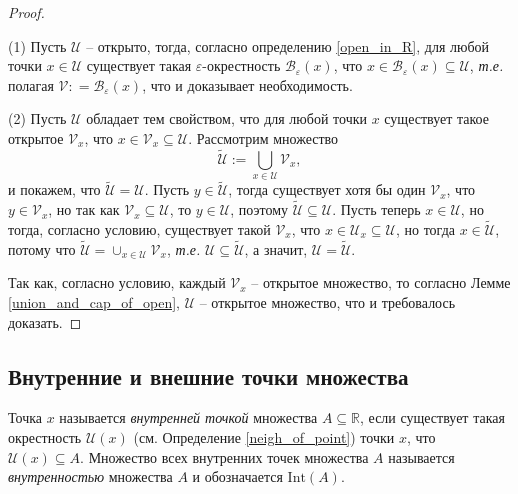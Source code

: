 \begin{proof}~

(1) Пусть $\mathscr{U}$ -- открыто, тогда, согласно определению \ref{open_in_R}, для любой точки $x\in \mathscr{U}$ существует такая $\varepsilon$-окрестность $\mathscr{B}_\varepsilon(x)$, что $x \in \mathscr{B}_\varepsilon(x) \subseteq \mathscr{U}$, \textit{т.е.} полагая $\mathscr{V}: = \mathscr{B}_\varepsilon(x)$, что и доказывает необходимость.

(2) Пусть $\mathscr{U}$ обладает тем свойством, что для любой точки $x$ существует такое открытое $\mathscr{V}_x$, что $x\in \mathscr{V}_x \subseteq \mathscr{U}.$ Рассмотрим множество
\begin{equation}
  \widetilde{\mathscr{U}}:=\bigcup_{x\in \mathscr{U}}\mathscr{V}_x, \label{open=union_of_opens}    
\end{equation}
и покажем, что $\widetilde{\mathscr{U}} = \mathscr{U}$. Пусть $y\in \widetilde{\mathscr{U}}$, тогда существует хотя бы один $\mathscr{V}_x$, что $y \in \mathscr{V}_x$, но так как $\mathscr{V}_x \subseteq \mathscr{U}$, то $y \in \mathscr{U}$, поэтому $\widetilde{\mathscr{U}} \subseteq \mathscr{U}.$ Пусть теперь $x \in \mathscr{U}$, но тогда, согласно условию, существует такой $\mathscr{V}_x$, что $x \in \mathscr{U}_x \subseteq \mathscr{U}$, но тогда $x \in \widetilde{\mathscr{U}}$, потому что $\widetilde{\mathscr{U}} = \cup_{x \in \mathscr{U}}\mathscr{V}_x$, \textit{т.е.} $\mathscr{U} \subseteq \widetilde{\mathscr{U}}$, а значит, $\mathscr{U} = \widetilde{\mathscr{U}}.$

Так как, согласно условию, каждый $\mathscr{V}_x$ -- открытое множество, то согласно Лемме \ref{union_and_cap_of_open}, $\mathscr{U}$ -- открытое множество, что и требовалось доказать.
\end{proof}


\subsection{Внутренние и внешние точки множества}

\begin{definition}\label{interior_point}
    Точка $x$ называется \textit{внутренней точкой} множества $A \subseteq \mathbb{R}$, если существует такая окрестность $\mathscr{U}(x)$ (см. Определение \ref{neigh_of_point}) точки $x$, что $\mathscr{U}(x) \subseteq A.$ Множество всех внутренних точек множества $A$ называется \textit{внутренностью} множества $A$ и обозначается $\mathrm{Int}(A).$
\end{definition}

